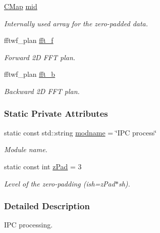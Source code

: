 \begin{DoxyCompactItemize}
\hyperlink{ipc_8h_aaf0c91c1c42122a86a1b963a42866c64}{CMap} \hyperlink{classIPCprocess_a14c316de2b5e883defea5c62db959c4a}{mid}
\begin{DoxyCompactList}\small\item\em Internally used array for the zero-\/padded data. \item\end{DoxyCompactList}\item 
fftwf\_\-plan \hyperlink{classIPCprocess_a1114cd499fb7ca67753ed2427e829320}{fft\_\-f}
\begin{DoxyCompactList}\small\item\em Forward 2D FFT plan. \item\end{DoxyCompactList}\item 
fftwf\_\-plan \hyperlink{classIPCprocess_a4eb21e0faa8cc40e6db4bce50752dec4}{fft\_\-b}
\begin{DoxyCompactList}\small\item\em Backward 2D FFT plan. \item\end{DoxyCompactList}\end{DoxyCompactItemize}
\subsubsection*{Static Private Attributes}
\begin{DoxyCompactItemize}
\item 
static const std::string \hyperlink{classIPCprocess_ad63fb78494555bf8dbf32948a8da9759}{modname} = \char`\"{}IPC process\char`\"{}
\begin{DoxyCompactList}\small\item\em Module name. \item\end{DoxyCompactList}\item 
static const int \hyperlink{classIPCprocess_a5cb65961fa5a3aa40ae93f67f761ff87}{zPad} = 3
\begin{DoxyCompactList}\small\item\em Level of the zero-\/padding (ish=zPad$\ast$sh). \item\end{DoxyCompactList}\end{DoxyCompactItemize}


\subsubsection{Detailed Description}
IPC processing.

